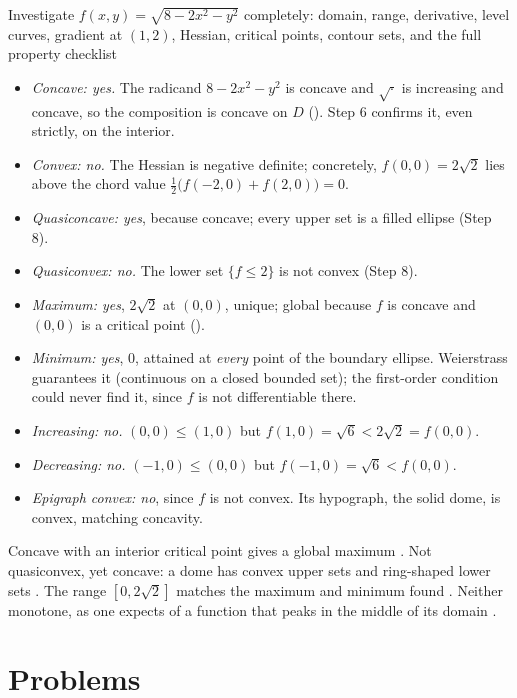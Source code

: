\begin{worked}{Investigate $f(x,y)=\sqrt{8-2x^{2}-y^{2}}$ completely: domain, range, derivative, level curves, gradient at $(1,2)$, Hessian, critical points, contour sets, and the full property checklist}
\begin{itemize}[leftmargin=1.6em,itemsep=0.3ex]
  \item \emph{Concave: yes.} The radicand $8-2x^{2}-y^{2}$ is concave and
        $\sqrt{\cdot}$ is increasing and concave, so the composition is
        concave on $D$ (). Step 6 confirms it, even strictly,
        on the interior.
  \item \emph{Convex: no.} The Hessian is negative definite; concretely,
        $f(0,0)=2\sqrt2$ lies above the chord value
        $\tfrac12\bigl(f(-2,0)+f(2,0)\bigr)=0$.
  \item \emph{Quasiconcave: yes}, because concave; every upper set is a
        filled ellipse (Step 8).
  \item \emph{Quasiconvex: no.} The lower set $\{f\le2\}$ is not convex
        (Step 8).
  \item \emph{Maximum: yes}, $2\sqrt2$ at $(0,0)$, unique; global because
        $f$ is concave and $(0,0)$ is a critical point ().
  \item \emph{Minimum: yes}, $0$, attained at \emph{every} point of the
        boundary ellipse. Weierstrass guarantees it (continuous on a closed
        bounded set); the first-order condition could never find it, since
        $f$ is not differentiable there.
  \item \emph{Increasing: no.} $(0,0)\le(1,0)$ but
        $f(1,0)=\sqrt6<2\sqrt2=f(0,0)$.
  \item \emph{Decreasing: no.} $(-1,0)\le(0,0)$ but
        $f(-1,0)=\sqrt6<f(0,0)$.
  \item \emph{Epigraph convex: no}, since $f$ is not convex. Its
        hypograph, the solid dome, is convex, matching concavity.
\end{itemize}

Concave with an interior critical point gives a global maximum
\checkmark. Not quasiconvex, yet concave: a dome has convex upper sets and
ring-shaped lower sets \checkmark. The range $[0,2\sqrt2]$ matches the
maximum and minimum found \checkmark. Neither monotone, as one expects of
a function that peaks in the middle of its domain \checkmark.
\end{worked}

\section{Problems}

